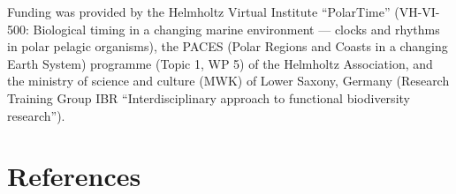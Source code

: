 Funding was provided by the Helmholtz Virtual Institute “PolarTime” (VH-VI-500:
Biological timing in a changing marine environment — clocks and rhythms in
polar pelagic organisms), the PACES (Polar Regions and Coasts in a changing
Earth System) programme (Topic 1, WP 5) of the Helmholtz Association, and the
ministry of science and culture (MWK) of Lower Saxony, Germany (Research
Training Group IBR “Interdisciplinary approach to functional biodiversity
research”).

\section{References}

